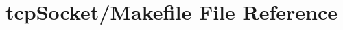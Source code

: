 \hypertarget{tcpSocket_2Makefile}{\section{tcp\-Socket/\-Makefile File Reference}
\label{tcpSocket_2Makefile}
}
